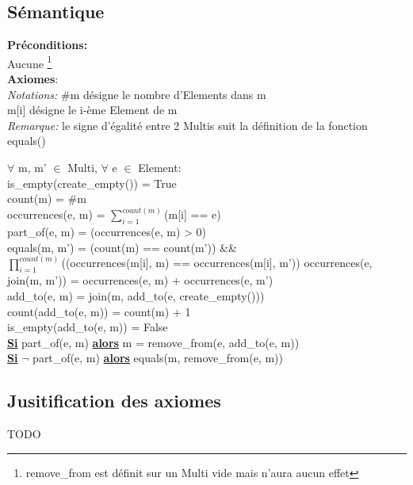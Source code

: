\documentclass[a4paper, 11pt, oneside]{article}
\begin{document}
	\subsection{Sémantique}
	\noindent \textbf{Préconditions:}
	\\ \indent Aucune \footnote{remove\_from est définit sur un Multi vide mais n'aura aucun effet}
	\\ \textbf{Axiomes}:
	\\ \indent \textit{Notations:} \#m désigne le nombre d'Elements dans m 
	\\ \indent \indent \indent \indent \indent m[i] désigne le i-ème Element de m
	\\ \indent \textit{Remarque:} le signe d'égalité entre 2 Multis suit la définition de la fonction equals()
	\begin{spacing}{1.5}
	\indent $\forall$ m, m' $\in$ Multi, $\forall$ e $\in$ Element:
	\\ \indent \indent is\_empty(create\_empty()) = True
	\\ \indent \indent count(m) = \#m
	\\ \indent \indent occurrences(e, m) = $\sum\limits_{i=1}^{count(m)}$(m[i] == e)
	\\ \indent \indent part\_of(e, m) = (occurrences(e, m) > 0)
	\\ \indent \indent equals(m, m') = (count(m) == count(m')) \&\& 
	\\ \indent \indent \indent \indent $\prod\limits_{i=1}^{count(m)}$((occurrences(m[i], m) == occurrences(m[i], m'))
	\clearpage
	\indent \indent occurrences(e, join(m, m')) = occurrences(e, m) + occurrences(e, m')
	\\ \indent \indent add\_to(e, m) = join(m, add\_to(e, create\_empty()))
	\\ \indent \indent count(add\_to(e, m)) = count(m) + 1
	\\ \indent \indent is\_empty(add\_to(e, m)) = False	
	\\ \indent \indent \textbf{\underline{Si}} part\_of(e, m) \textbf{\underline{alors}} m = remove\_from(e, add\_to(e, m))
	\\ \indent \indent \textbf{\underline{Si}} $\neg$ part\_of(e, m) \textbf{\underline{alors}} equals(m, remove\_from(e, m))
	\end{spacing}
	
	\subsection{Jusitification des axiomes}
	\color{blue} TODO \color{black}
	
\end{document}
